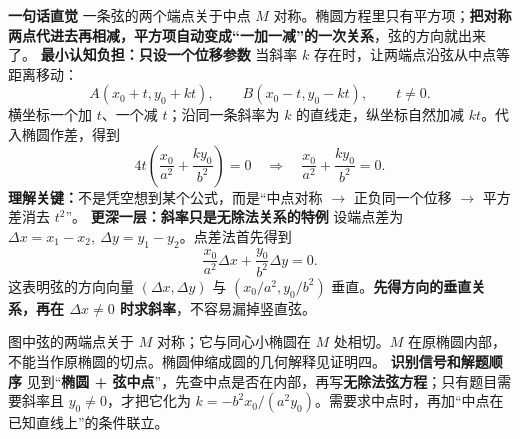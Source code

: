 \begin{explanationbox}
\textbf{\textcolor{CExplanation}{一句话直觉}}
一条弦的两个端点关于中点 $M$ 对称。椭圆方程里只有平方项；\textbf{把对称两点代进去再相减，平方项自动变成“一加一减”的一次关系}，弦的方向就出来了。
\medskip
\textbf{\textcolor{CExplanation}{最小认知负担：只设一个位移参数}}
当斜率 $k$ 存在时，让两端点沿弦从中点等距离移动：
\[
 A(x_0+t,y_0+kt),\qquad B(x_0-t,y_0-kt),\qquad t\ne0.
\]
横坐标一个加 $t$、一个减 $t$；沿同一条斜率为 $k$ 的直线走，纵坐标自然加减 $kt$。代入椭圆作差，得到
\[
 4t\left(\frac{x_0}{a^2}+\frac{k y_0}{b^2}\right)=0
 \quad\Longrightarrow\quad \frac{x_0}{a^2}+\frac{k y_0}{b^2}=0.
\]
\textbf{理解关键：}不是凭空想到某个公式，而是“中点对称 $\to$ 正负同一个位移 $\to$ 平方差消去 $t^2$”。
\medskip
\textbf{\textcolor{CExplanation}{更深一层：斜率只是无除法关系的特例}}
设端点差为 $\Delta x=x_1-x_2,\ \Delta y=y_1-y_2$。点差法首先得到
\[
 \boxed{\frac{x_0}{a^2}\Delta x+\frac{y_0}{b^2}\Delta y=0.}
\]
这表明弦的方向向量 $(\Delta x,\Delta y)$ 与 $(x_0/a^2,y_0/b^2)$ 垂直。\textbf{先得方向的垂直关系，再在 $\Delta x\ne0$ 时求斜率}，不容易漏掉竖直弦。
\medskip
\begin{center}\end{center}
图中弦的两端点关于 $M$ 对称；它与同心小椭圆在 $M$ 处相切。$M$ 在原椭圆内部，不能当作原椭圆的切点。椭圆伸缩成圆的几何解释见证明四。
\medskip
\textbf{\textcolor{CExplanation}{识别信号和解题顺序}}
见到“\textbf{椭圆 + 弦中点}”，先查中点是否在内部，再写\textbf{无除法弦方程}；只有题目需要斜率且 $y_0\ne0$，才把它化为 $k=-b^2x_0/(a^2y_0)$。需要求中点时，再加“中点在已知直线上”的条件联立。
\end{explanationbox}

